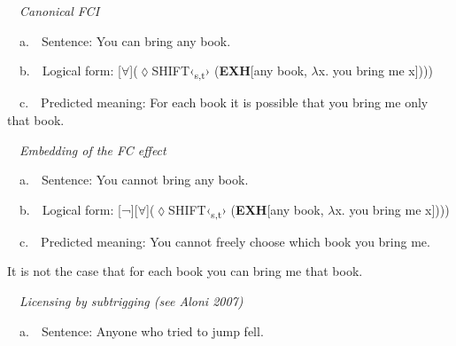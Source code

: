 \begin{styleStandard}
\label{bkm:Ref63544535}\ \ \textit{Canonical FCI}
\end{styleStandard}

\begin{styleStandard}
\ \ a.\ \ Sentence: You can bring any book.
\end{styleStandard}

\begin{styleStandard}
\ \ b.\ \ Logical form: [${\forall}$](${\lozenge}$\textsc{SHIFT}‹\textsubscript{s,t}› (\textbf{EXH}[any book, $\lambda $x. you bring me x])))
\end{styleStandard}

\begin{styleStandard}
\ \ c.\ \ Predicted meaning: For each book it is possible that you bring me only that book.
\end{styleStandard}

\begin{styleStandard}
\label{bkm:Ref63544537}\ \ \textit{Embedding of the FC effect}
\end{styleStandard}

\begin{styleStandard}
\ \ a.\ \ Sentence: You cannot bring any book.
\end{styleStandard}

\begin{styleStandard}
\ \ b.\ \ Logical form: [¬][${\forall}$](${\lozenge}$\textsc{SHIFT}‹\textsubscript{s,t}› (\textbf{EXH}[any book, $\lambda $x. you bring me x])))
\end{styleStandard}

\begin{styleStandard}
\ \ c.\ \ Predicted meaning: You cannot freely choose which book you bring me.
\end{styleStandard}

\begin{styleStandard}
It is not the case that for each book you can bring me that book.
\end{styleStandard}

\begin{styleStandard}
\label{bkm:Ref54857683}\ \ \textit{Licensing by subtrigging (see Aloni 2007)}
\end{styleStandard}

\begin{styleStandard}
\ \ a.\ \ Sentence: Anyone who tried to jump fell.
\end{styleStandard}

